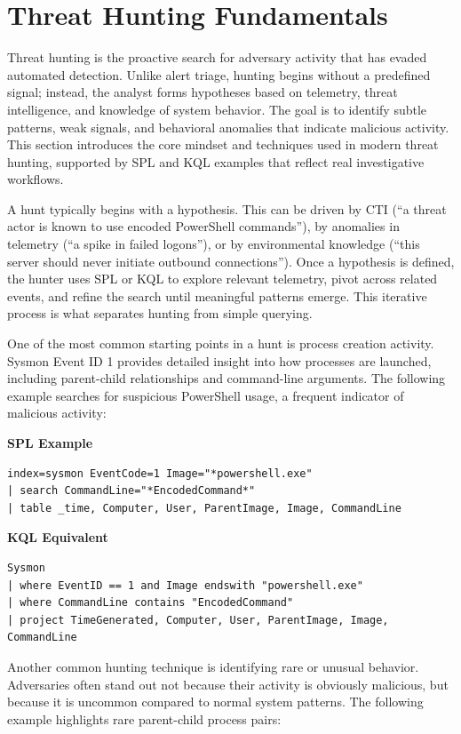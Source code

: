 \section{Threat Hunting Fundamentals}

Threat hunting is the proactive search for adversary activity that has evaded automated detection. Unlike alert triage, 
hunting begins without a predefined signal; instead, the analyst forms hypotheses based on telemetry, threat intelligence, 
and knowledge of system behavior. The goal is to identify subtle patterns, weak signals, and behavioral anomalies that 
indicate malicious activity. This section introduces the core mindset and techniques used in modern threat hunting, supported 
by SPL and KQL examples that reflect real investigative workflows.

A hunt typically begins with a hypothesis. This can be driven by CTI (“a threat actor is known to use encoded PowerShell commands”),
 by anomalies in telemetry (“a spike in failed logons”), or by environmental knowledge (“this server should never initiate 
 outbound connections”). Once a hypothesis is defined, the hunter uses SPL or KQL to explore relevant telemetry, pivot across 
 related events, and refine the search until meaningful patterns emerge. This iterative process is what separates hunting from 
 simple querying.

One of the most common starting points in a hunt is process creation activity. Sysmon Event ID 1 provides detailed insight into 
how processes are launched, including parent-child relationships and command-line arguments. The following example searches for 
suspicious PowerShell usage, a frequent indicator of malicious activity:

\textbf{SPL Example}
\begin{lstlisting}
index=sysmon EventCode=1 Image="*powershell.exe"
| search CommandLine="*EncodedCommand*"
| table _time, Computer, User, ParentImage, Image, CommandLine
\end{lstlisting}

\textbf{KQL Equivalent}
\begin{lstlisting}
Sysmon
| where EventID == 1 and Image endswith "powershell.exe"
| where CommandLine contains "EncodedCommand"
| project TimeGenerated, Computer, User, ParentImage, Image, CommandLine
\end{lstlisting}

Another common hunting technique is identifying rare or unusual behavior. Adversaries often stand out not because their activity is 
obviously malicious, but because it is uncommon compared to normal system patterns. The following example highlights rare parent-child 
process pairs:


